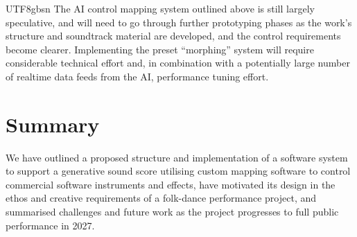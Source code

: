 \documentclass[manuscript,review,anonymous,natbib=false]{acmart}
\begin{document}
\begin{CJK*}{UTF8}{gbsn}
  The AI control mapping system outlined above is still largely speculative, and will need to go through further prototyping phases as the work's structure and soundtrack material are developed, and the control requirements become clearer. Implementing the preset ``morphing'' system will require considerable technical effort and, in combination with a potentially large number of realtime data feeds from the AI, performance tuning effort.

  \section{Summary}

  We have outlined a proposed structure and implementation of a software system to support a generative sound score utilising custom mapping software to control commercial software instruments and effects, have motivated its design in the ethos and creative requirements of a folk-dance performance project, and summarised challenges and future work as the project progresses to full public performance in 2027.

\end{CJK*}


\printbibliography
\end{document}
